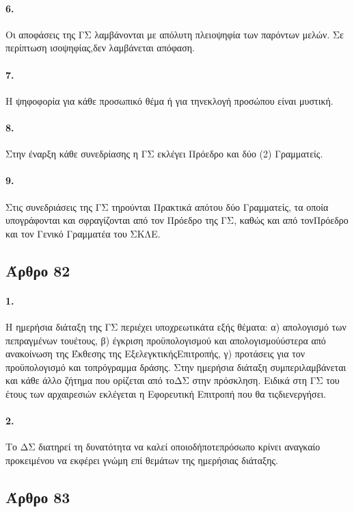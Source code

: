 \documentclass[a4paper,oneside, 10pt]{book}
\begin{document}
\paragraph { 6. } Οι αποφάσεις της ΓΣ λαμβάνονται με απόλυτη πλειοψηφία των παρόντων μελών. Σε περίπτωση ισοψηφίας,δεν λαμβάνεται απόφαση.
\paragraph { 7. } Η ψηφοφορία για κάθε προσωπικό θέμα ή για τηνεκλογή προσώπου είναι μυστική.
\paragraph { 8. } Στην έναρξη κάθε συνεδρίασης η ΓΣ εκλέγει Πρόεδρο και δύο (2) Γραμματείς.
\paragraph { 9. } Στις συνεδριάσεις της ΓΣ τηρούνται Πρακτικά απότου δύο Γραμματείς, τα οποία υπογράφονται και σφραγίζονται από τον Πρόεδρο της ΓΣ, καθώς και από τονΠρόεδρο και τον Γενικό Γραμματέα του ΣΚΛΕ.
\subsection*{ Άρθρο 82 }
\paragraph { 1. } Η ημερήσια διάταξη της ΓΣ περιέχει υποχρεωτικάτα εξής θέματα: α) απολογισμό των πεπραγμένων τουέτους, β) έγκριση προϋπολογισμού και απολογισμούύστερα από ανακοίνωση της Έκθεσης της ΕξελεγκτικήςΕπιτροπής, γ) προτάσεις για τον προϋπολογισμό και τοπρόγραμμα δράσης. Στην ημερήσια διάταξη συμπεριλαμβάνεται και κάθε άλλο ζήτημα που ορίζεται από τοΔΣ στην πρόσκληση. Ειδικά στη ΓΣ του έτους των αρχαιρεσιών εκλέγεται η Εφορευτική Επιτροπή που θα τιςδιενεργήσει.
\paragraph { 2. } Το ΔΣ διατηρεί τη δυνατότητα να καλεί οποιοδήποτεπρόσωπο κρίνει αναγκαίο προκειμένου να εκφέρει γνώμη επί θεμάτων της ημερήσιας διάταξης.
\subsection*{ Άρθρο 83 }
\end{document}
